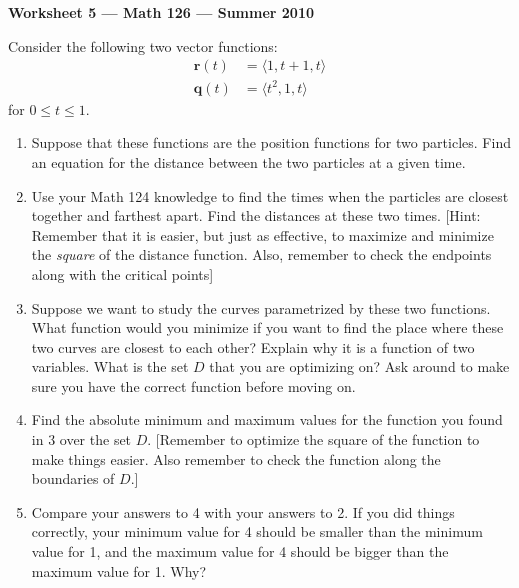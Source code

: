 \documentclass[oneside,1pt]{article}
\begin{document}
\begin{center}
{\bf Worksheet 5 --- Math 126 --- Summer 2010}
\end{center}

\noindent Consider the following two vector functions:
\begin{align*}
\mathbf r(t)&=\langle1,t+1,t\rangle \\
\mathbf q(t)&=\langle t^2,1,t\rangle
\end{align*}
for $0\leq t\leq 1$.

\begin{enumerate}
\item Suppose that these functions are the position functions for two particles. Find an equation for the distance between the two particles at a given time. 

\vfill

\item Use your Math 124 knowledge to find the times when the particles are closest together and farthest apart. Find the distances at these two times. [Hint: Remember that it is easier, but just as effective, to maximize and minimize the \emph{square} of the distance function. Also, remember to check the endpoints along with the critical points]

\vfill
\item Suppose we want to study the curves parametrized by these two functions. What function would you minimize if you want to find the place where these two curves are closest to each other? Explain why it is a function of two variables. What is the set $D$ that you are optimizing on? Ask around to make sure you have the correct function before moving on.
\vfill
\newpage

\item Find the absolute minimum and maximum values for the function you found in 3 over the set $D$. [Remember to optimize the square of the function to make things easier. Also remember to check the function along the boundaries of $D$.]

\vfill

\item Compare your answers to 4 with your answers to 2. If you did things correctly, your minimum value for 4 should be smaller than the minimum value for 1, and the maximum value for 4 should be bigger than the maximum value for 1. Why?


\hfill 

\hfill
\end{enumerate}
\end{document}
